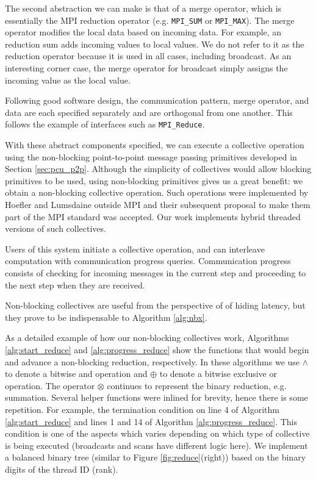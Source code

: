 The second abstraction we can make is that of a merge operator, which is
essentially the MPI reduction operator
(e.g. \texttt{MPI\_SUM} or \texttt{MPI\_MAX}).
The merge operator modifies the local data based on incoming data.
For example, an reduction sum adds incoming values to local values.
We do not refer to it as the reduction operator because it is used
in all cases, including broadcast.
As an interesting corner case, the merge operator for broadcast simply
assigns the incoming value as the local value.

Following good software design, the communication pattern,
merge operator, and data are each specified separately
and are orthogonal from one another.
This follows the example of interfaces such as \texttt{MPI\_Reduce}.

With these abstract components specified, we can execute a collective
operation
using the non-blocking point-to-point message passing primitives
developed in Section \ref{sec:pcu_p2p}.
Although the simplicity of collectives would allow blocking primitives
to be used, using non-blocking primitives gives us a great benefit:
we obtain a non-blocking collective operation.
Such operations were implemented by Hoefler and Lumsdaine outside MPI
\cite{hoefler2007implementation}
and their subsequent proposal to make them part of the MPI standard
\cite{hoefler2007case} was accepted.
Our work implements hybrid threaded versions of such collectives.

Users of this system initiate a collective operation, and can interleave
computation with communication progress queries.
Communication progress consists of checking for incoming messages in the current
step and proceeding to the next step when they are received.

Non-blocking collectives are useful from the perspective of
of hiding latency, but they prove to be indispensable to
Algorithm \ref{alg:nbx}.

As a detailed example of how our non-blocking collectives work,
Algorithms \ref{alg:start_reduce} and \ref{alg:progress_reduce}
show the functions that would begin and advance a non-blocking
reduction, respectively.
In these algorithms we use $\wedge$ to denote a bitwise and
operation and $\oplus$ to denote a bitwise exclusive or operation.
The operator $\otimes$ continues to represent the binary reduction,
e.g. summation.
Several helper functions were inlined for brevity, hence there
is some repetition.
For example, the termination condition on line 4 of Algorithm
\ref{alg:start_reduce} and lines 1 and 14 of Algorithm \ref{alg:progress_reduce}.
This condition is one of the aspects which varies depending on
which type of collective is being executed (broadcasts and scans
have different logic here).
We implement a balanced binary tree (similar to Figure \ref{fig:reduce}(right))
based on the binary digits of the thread ID (rank).

